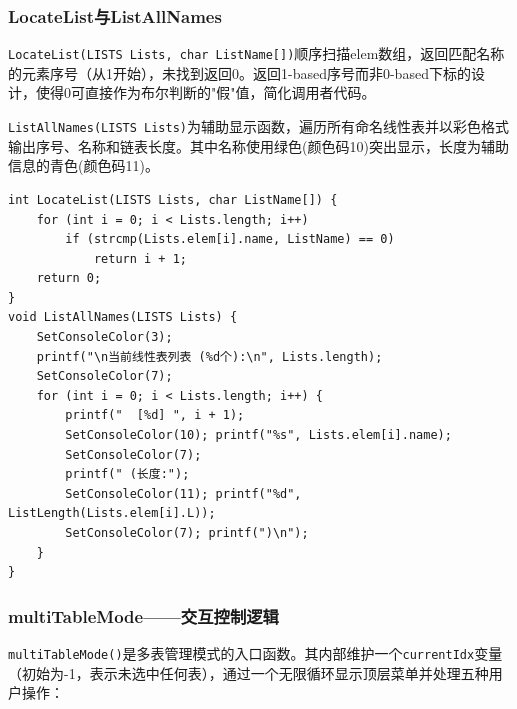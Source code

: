 \documentclass[supercite]{Experimental_Report}
\begin{document}
\subsubsection{LocateList与ListAllNames}

\texttt{LocateList(LISTS Lists, char ListName[])}顺序扫描elem数组，返回匹配名称的元素序号（从1开始），未找到返回0。返回1-based序号而非0-based下标的设计，使得0可直接作为布尔判断的"假"值，简化调用者代码。

\texttt{ListAllNames(LISTS Lists)}为辅助显示函数，遍历所有命名线性表并以彩色格式输出序号、名称和链表长度。其中名称使用绿色(颜色码10)突出显示，长度为辅助信息的青色(颜色码11)。

\begin{lstlisting}[caption={LocateList与ListAllNames}]
% Mermaid 参考: 图23 (LocateList) — 见 Mermaid流程图.txt
int LocateList(LISTS Lists, char ListName[]) {
    for (int i = 0; i < Lists.length; i++)
        if (strcmp(Lists.elem[i].name, ListName) == 0)
            return i + 1;
    return 0;
}
void ListAllNames(LISTS Lists) {
    SetConsoleColor(3);
    printf("\n当前线性表列表 (%d个):\n", Lists.length);
    SetConsoleColor(7);
    for (int i = 0; i < Lists.length; i++) {
        printf("  [%d] ", i + 1);
        SetConsoleColor(10); printf("%s", Lists.elem[i].name);
        SetConsoleColor(7);
        printf(" (长度:");
        SetConsoleColor(11); printf("%d", ListLength(Lists.elem[i].L));
        SetConsoleColor(7); printf(")\n");
    }
}
\end{lstlisting}

\subsubsection{multiTableMode——交互控制逻辑}

\texttt{multiTableMode()}是多表管理模式的入口函数。其内部维护一个\texttt{currentIdx}变量（初始为-1，表示未选中任何表），通过一个无限循环显示顶层菜单并处理五种用户操作：
\end{document}
